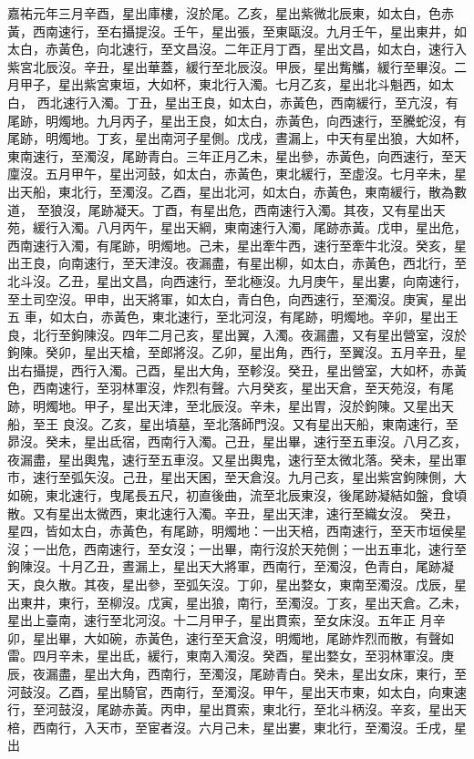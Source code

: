 \begin{pinyinscope}
 嘉祐元年三月辛酉，星出庫樓，沒於尾。乙亥，星出紫微北辰東，如太白，色赤黃，西南速行，至右攝提沒。壬午，星出張，至東甌沒。九月壬午，星出東井，如太白，赤黃色，向北速行，至文昌沒。二年正月丁酉，星出文昌，如太白，速行入紫宮北辰沒。辛丑，星出華蓋，緩行至北辰沒。甲辰，星出觜觿，緩行至畢沒。二月甲子，星出紫宮東垣，大如杯，東北行入濁。七月乙亥，星出北斗魁西，如太白，
 西北速行入濁。丁丑，星出王良，如太白，赤黃色，西南緩行，至亢沒，有尾跡，明燭地。九月丙子，星出王良，如太白，赤黃色，向西速行，至騰蛇沒，有尾跡，明燭地。丁亥，星出南河子星側。戊戌，晝漏上，中天有星出狼，大如杯，東南速行，至濁沒，尾跡青白。三年正月乙未，星出參，赤黃色，向西速行，至天廩沒。五月甲午，星出河鼓，如太白，赤黃色，東北緩行，至虛沒。七月辛未，星出天船，東北行，至濁沒。乙酉，星出北河，如太白，赤黃色，東南緩行，散為數道，
 至狼沒，尾跡凝天。丁酉，有星出危，西南速行入濁。其夜，又有星出天苑，緩行入濁。八月丙午，星出天綱，東南速行入濁，尾跡赤黃。戊申，星出危，西南速行入濁，有尾跡，明燭地。己未，星出牽牛西，速行至牽牛北沒。癸亥，星出王良，向南速行，至天津沒。夜漏盡，有星出柳，如太白，赤黃色，西北行，至北斗沒。乙丑，星出文昌，向西速行，至北極沒。九月庚午，星出婁，向南速行，至土司空沒。甲申，出天將軍，如太白，青白色，向西速行，至濁沒。庚寅，星出五
 車，如太白，赤黃色，東北速行，至北河沒，有尾跡，明燭地。辛卯，星出王良，北行至鉤陳沒。四年二月己亥，星出翼，入濁。夜漏盡，又有星出營室，沒於鉤陳。癸卯，星出天槍，至郎將沒。乙卯，星出角，西行，至翼沒。五月辛丑，星出右攝提，西行入濁。己酉，星出大角，至軫沒。癸丑，星出營室，大如杯，赤黃色，西南速行，至羽林軍沒，炸烈有聲。六月癸亥，星出天倉，至天苑沒，有尾跡，明燭地。甲子，星出天津，至北辰沒。辛未，星出胃，沒於鉤陳。又星出天船，至王
 良沒。乙亥，星出墳墓，至北落師門沒。又有星出天船，東南速行，至昴沒。癸未，星出氐宿，西南行入濁。己丑，星出畢，速行至五車沒。八月乙亥，夜漏盡，星出輿鬼，速行至五車沒。又星出輿鬼，速行至太微北落。癸未，星出軍市，速行至弧矢沒。己丑，星出天囷，至天倉沒。九月己亥，星出紫宮鉤陳側，大如碗，東北速行，曳尾長五尺，初直後曲，流至北辰東沒，後尾跡凝結如盤，食頃散。又有星出太微西，東北速行入濁。辛丑，星出天津，速行至織女沒。
 癸丑，星四，皆如太白，赤黃色，有尾跡，明燭地：一出天棓，西南速行，至天市垣侯星沒；一出危，西南速行，至女沒；一出畢，南行沒於天苑側；一出五車北，速行至鉤陳沒。十月乙丑，晝漏上，星出天大將軍，西南行，至濁沒，色青白，尾跡凝天，良久散。其夜，星出參，至弧矢沒。丁卯，星出婺女，東南至濁沒。戊辰，星出東井，東行，至柳沒。戊寅，星出狼，南行，至濁沒。丁亥，星出天倉。乙未，星出上臺南，速行至北河沒。十二月甲子，星出貫索，至女床沒。五年正
 月辛卯，星出畢，大如碗，赤黃色，速行至天倉沒，明燭地，尾跡炸烈而散，有聲如雷。四月辛未，星出氐，緩行，東南入濁沒。癸酉，星出婺女，至羽林軍沒。庚辰，夜漏盡，星出大角，西南行，至濁沒，尾跡青白。癸未，星出女床，東行，至河鼓沒。乙酉，星出騎官，西南行，至濁沒。甲午，星出天市東，如太白，向東速行，至河鼓沒，尾跡赤黃。丙申，星出貫索，東北行，至北斗柄沒。辛亥，星出天棓，西南行，入天市，至宦者沒。六月己未，星出婁，東北行，至濁沒。壬戌，星出

\end{pinyinscope}
